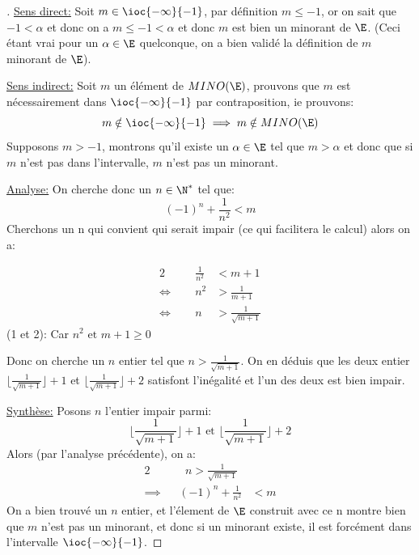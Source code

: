 \begin{proof}[\unskip\nopunct]
   \underline{Sens direct:}\+
   Soit $m \in \ioc{-\infty}{-1}$, par définition $m \leq -1$, or on sait que $-1 < \alpha$ et donc on a $m \leq -1 < \alpha$ et donc \(m\) est bien un minorant de $\E$. (Ceci étant vrai pour un \(\alpha \in \E\) quelconque, on a bien validé la définition de \(m\) minorant de $\E$).\<
   
   \underline{Sens indirect:}\+
   Soit $m$ un élément de $MINO(\E)$, prouvons que \(m\) est nécessairement dans $\ioc{-\infty}{-1}$ par contraposition, ie prouvons:
   \[
      m \notin \ioc{-\infty}{-1} \implies m \notin MINO(\E)
   \]
   Supposons $m > -1$, montrons qu'il existe un $\alpha \in \E$ tel que $m > \alpha$ et donc que si \(m\) n'est pas dans l'intervalle, \(m\) n'est pas un minorant.\<

   \underline{Analyse:}
   On cherche donc un \(n \in \N^*\) tel que:
   \[
      {(-1)}^n + \frac{1}{n^2} < m
   \]
   Cherchons un n qui convient qui serait impair (ce qui facilitera le calcul) alors on a:

   \begin{alignat}{2}
      && \;\; \frac{1}{n^2} &< m + 1\\
      \Longleftrightarrow&& \;\; n^2 &> \frac{1}{m+1}\\
      \Longleftrightarrow&& \;\; n &> \frac{1}{\sqrt{m+1}}
   \end{alignat}
   (1 et 2): Car \(n^2 \text{ et }m + 1 \geq 0\)\<
   
   Donc on cherche un \(n\) entier tel que \(n > \frac{1}{\sqrt{m+1}}\). On en déduis que les deux entier \(\lfloor\frac{1}{\sqrt{m+1}}\rfloor + 1\) et \(\lfloor\frac{1}{\sqrt{m+1}}\rfloor + 2\) satisfont l'inégalité et l'un des deux est bien impair.\<

   \underline{Synthèse:}
   Posons $n$ l'entier impair parmi:
   \[
      \lfloor\frac{1}{\sqrt{m+1}}\rfloor + 1 \text{ et } \lfloor\frac{1}{\sqrt{m+1}}\rfloor + 2 
   \]
   Alors (par l'analyse précédente), on a:
   \begin{alignat}{2}
      && \;\; n > \frac{1}{\sqrt{m+1}} \\
      \implies&& {(-1)}^n + \frac{1}{n^2} &< m
   \end{alignat}
   On a bien trouvé un \(n\) entier, et l'élement de \(\E\) construit avec ce n montre bien que \(m\) n'est pas un minorant, et donc si un minorant existe, il est forcément dans l'intervalle $\ioc{-\infty}{-1}$.

\end{proof}

